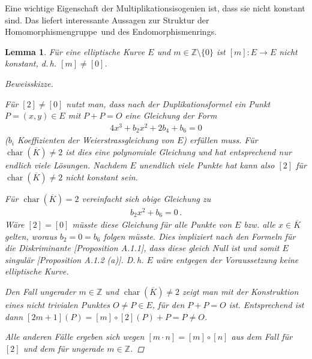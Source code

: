 \documentclass[english, german, parskip=half]{scrartcl}
\newtheorem{Lemma}[Satz]{Lemma}
\theoremstyle{definition}
\theoremstyle{remark}
\newcommand*{\Z}{\mathds{Z}}
\newcommand*{\algK}{\ensuremath{\overline K}} %
\renewcommand{\O}{O}
\DeclareMathOperator{\Char}{char} %
\begin{document}
Eine wichtige Eigenschaft der Multiplikationsisogenien ist, dass sie
nicht konstant sind. Das liefert interessante Aussagen zur Struktur
der Homomorphismengruppe~und des Endomorphismenrings.
\begin{Lemma}\label{additionnichtkonstant}
  Für eine elliptische Kurve $E$ und $m\in\Z\setminus\{0\}$
  ist $[m]\colon E\to E$ nicht konstant, d.\,h. $[m]\neq[0]$.
  \begin{proof}[Beweisskizze]
    \cite[siehe][Proposition III.4.2 (a)]{silverman}
    
    Für $[2]\neq[0]$ nutzt man, dass nach der Duplikationsformel 
    \cite[Group Law Algorithm III.2.3(d)]{silverman} ein Punkt $P=(x,y)\in
    E$ mit $P+P=\O$ eine Gleichung der Form
    \begin{gather*}
      4x^3 + b_2x^2 + 2b_4 + b_6 = 0
    \end{gather*}
    ($b_i$ Koeffizienten der Weierstrassgleichung von $E$)
    erfüllen muss.
    Für $\Char(\algK)\neq 2$ ist dies eine polynomiale Gleichung und hat
    entsprechend nur endlich viele Lösungen. Nachdem $E$ unendlich
    viele Punkte hat
    \cite[siehe][Exercise I.4.8 oder Section I.6]{hartshorne}
    kann also $[2]$ für $\Char(\algK)\neq 2$ nicht konstant sein.

    Für $\Char(\algK)=2$ vereinfacht sich obige Gleichung zu
    \begin{gather*}
      b_2x^2 + b_6 = 0\,.
    \end{gather*}
    Wäre $[2]=[0]$ müsste diese Gleichung für alle Punkte von $E$
    bzw. alle $x\in\algK$ gelten, woraus $b_2=0=b_6$ folgen müsste.
    Dies impliziert nach den Formeln für die Diskriminante 
    \cite{silverman}[Proposition A.1.1],
    dass diese gleich Null ist und somit $E$ singulär
    \cite{silverman}[Proposition A.1.2 (a)].
    D.\,h. $E$ wäre entgegen der Voraussetzung keine elliptische
    Kurve.
    
    Den Fall ungerader $m\in\Z$ und $\Char(\algK)\neq2$ zeigt man mit
    der Konstruktion eines nicht trivialen Punktes $\O\neq P\in E$,
    für den $P+P=\O$ ist. Entsprechend ist dann
    $[2m+1](P)=[m]\circ[2](P)+P=P\neq \O$.
    
    Alle anderen Fälle ergeben sich wegen
    $[m\cdot n]=[m]\circ[n]$ aus dem Fall für $[2]$ und dem für ungerade
    $m\in\Z$.
  \end{proof}
\end{Lemma}
\end{document}
